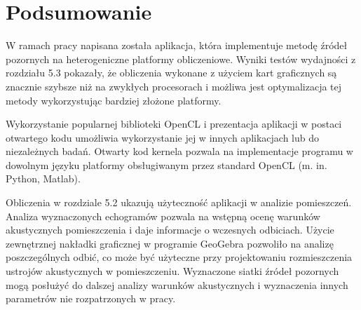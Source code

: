 \chapter{Podsumowanie}\label{cha:podsum}

W ramach pracy napisana została aplikacja, która implementuje metodę źródeł pozornych na heterogeniczne platformy obliczeniowe. Wyniki testów wydajności z rozdziału 5.3 pokazały, że obliczenia wykonane z użyciem kart graficznych są znacznie szybsze niż na zwykłych procesorach i możliwa jest optymalizacja tej metody wykorzystując bardziej złożone platformy.

Wykorzystanie popularnej biblioteki OpenCL i prezentacja aplikacji w postaci otwartego kodu umożliwia wykorzystanie jej w innych aplikacjach  lub do niezależnych badań. Otwarty kod kernela pozwala na implementacje programu w dowolnym języku platformy obsługiwanym przez standard OpenCL (m. in. Python, Matlab).

Obliczenia w rozdziale 5.2 ukazują użyteczność aplikacji w analizie pomieszczeń. Analiza wyznaczonych echogramów pozwala na wstępną ocenę warunków akustycznych pomieszczenia i daje informacje o wczesnych odbiciach. Użycie zewnętrznej nakładki graficznej w programie GeoGebra pozwoliło na analizę poszczególnych odbić, co może być użyteczne przy projektowaniu rozmieszczenia ustrojów akustycznych w pomieszczeniu. Wyznaczone siatki źródeł pozornych mogą posłużyć do dalszej analizy warunków akustycznych i wyznaczenia innych parametrów nie rozpatrzonych w pracy.